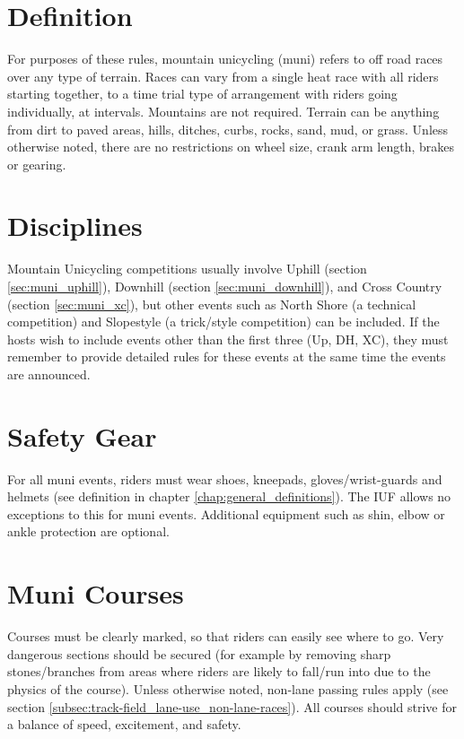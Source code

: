 
\section{Definition}
For purposes of these rules, mountain unicycling (muni) refers to off road races over any type of terrain.
Races can vary from a single heat race with all riders starting together, to a time trial type of arrangement with riders going individually, at intervals.
Mountains are not required.
Terrain can be anything from dirt to paved areas, hills, ditches, curbs, rocks, sand, mud, or grass.
Unless otherwise noted, there are no restrictions on wheel size, crank arm length, brakes or gearing.

\section{Disciplines}
Mountain Unicycling competitions usually involve Uphill (section \ref{sec:muni_uphill}), Downhill (section \ref{sec:muni_downhill}), and Cross Country (section \ref{sec:muni_xc}), but other events such as North Shore (a technical competition) and Slopestyle (a trick/style competition) can be included.
If the hosts wish to include events other than the first three (Up, DH, XC), they must remember to provide detailed rules for these events at the same time the events are announced.

\section{Safety Gear}
For all muni events, riders must wear shoes, kneepads, gloves/wrist-guards and helmets (see definition in chapter \ref{chap:general_definitions}).
The IUF allows no exceptions to this for muni events.
Additional equipment such as shin, elbow or ankle protection are optional.

\section{Muni Courses}
Courses must be clearly marked, so that riders can easily see where to go.
Very dangerous sections should be secured (for example by removing sharp stones/branches from areas where riders are likely to fall/run into due to the physics of the course).
Unless otherwise noted, non-lane passing rules apply (see section \ref{subsec:track-field_lane-use_non-lane-races}).
All courses should strive for a balance of speed, excitement, and safety.

